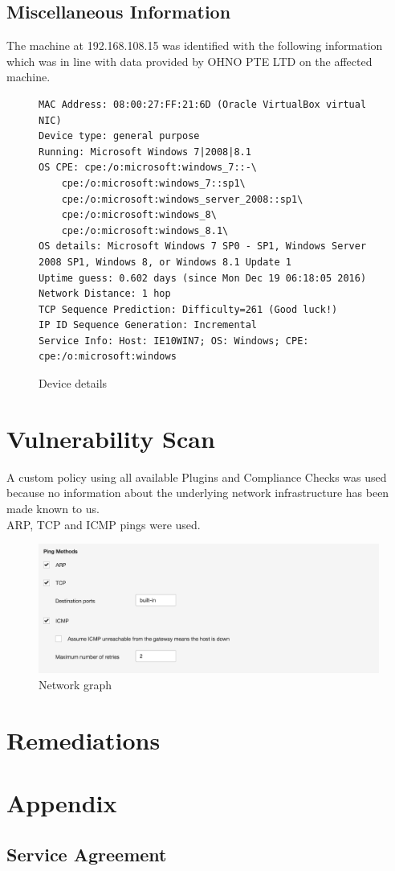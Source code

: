 \documentclass[11pt, oneside]{article}   	%
\begin{document}
\subsection{Miscellaneous Information}
The machine at 192.168.108.15 was identified with the following information which was 
in line with data provided by OHNO PTE LTD on the affected machine.
\begin{figure}[h!]
	\fontsize{8pt}{4pt}
	\begin{verbatim}
MAC Address: 08:00:27:FF:21:6D (Oracle VirtualBox virtual NIC)
Device type: general purpose
Running: Microsoft Windows 7|2008|8.1
OS CPE: cpe:/o:microsoft:windows_7::-\
	cpe:/o:microsoft:windows_7::sp1\
	cpe:/o:microsoft:windows_server_2008::sp1\
	cpe:/o:microsoft:windows_8\
	cpe:/o:microsoft:windows_8.1\
OS details: Microsoft Windows 7 SP0 - SP1, Windows Server 2008 SP1, Windows 8, or Windows 8.1 Update 1
Uptime guess: 0.602 days (since Mon Dec 19 06:18:05 2016)
Network Distance: 1 hop
TCP Sequence Prediction: Difficulty=261 (Good luck!)
IP ID Sequence Generation: Incremental
Service Info: Host: IE10WIN7; OS: Windows; CPE: cpe:/o:microsoft:windows
	\end{verbatim}
	\caption{Device details}
\end{figure}

\section{Vulnerability Scan}
A custom policy using all available Plugins and Compliance Checks was used because
no information about the underlying network infrastructure has been made known to us.\\





ARP, TCP and ICMP pings were used.

\begin{figure}[h!]
	\centering
	\includegraphics[width=380pt]{ping-methods.png}
	\caption{Network graph}
	\label{NetworkGraph}
\end{figure}


\section{Remediations}
\appendix
\section{Appendix}
\subsection{Service Agreement}
\end{document}
